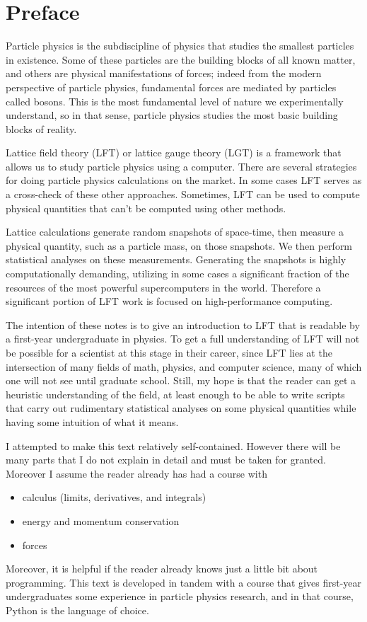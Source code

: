 \documentclass[12pt]{book}
\theoremstyle{definition}
\begin{document}
\chapter{Preface}

Particle physics is the subdiscipline of physics that studies the smallest
particles in existence. Some of these particles are the building blocks of all known
matter, and others are physical manifestations of forces; indeed from the
modern perspective of particle physics, fundamental forces are mediated by
particles called bosons. This is the most fundamental level of nature we
experimentally understand, so in that sense, particle physics studies
the most basic building blocks of reality.

Lattice field theory (LFT) or lattice gauge theory (LGT) is a framework that
allows us to study particle physics using a computer. There are several
strategies for doing particle physics calculations on the market. In some cases
LFT serves as a cross-check of these other approaches. Sometimes, LFT can be
used to compute physical quantities that can't be computed using other methods.

Lattice calculations generate random snapshots of space-time, then measure a
physical quantity, such as a particle mass, on those snapshots. We then
perform statistical analyses on these measurements. Generating the snapshots is 
highly computationally demanding, utilizing in some cases a significant 
fraction of the resources of the most powerful supercomputers in the world. 
Therefore a significant portion of LFT work is focused on high-performance
computing.

The intention of these notes is to give an introduction to LFT that is
readable by a first-year undergraduate in physics. To get a full understanding
of LFT will not be possible for a scientist at this stage in their career, since
LFT lies at the intersection of many fields of math, physics, and computer
science, many of which one will not see until graduate school. Still, my hope is
that the reader can get a heuristic understanding of the field, at least enough
to be able to write scripts that carry out rudimentary statistical analyses on
some physical quantities while having some intuition of what it means.

I attempted to make this text relatively self-contained. However there will be
many parts that I do not explain in detail and must be taken for granted.
Moreover I assume the reader already has had a course with 
\begin{itemize}
  \item calculus (limits, derivatives, and integrals)
  \item energy and momentum conservation
  \item forces
\end{itemize}
Moreover, it is helpful if the reader already knows just a little bit about programming.
This text is developed in tandem with a course that gives first-year
undergraduates some experience in particle physics research, and in that course,
Python is the language of choice.
\end{document}
